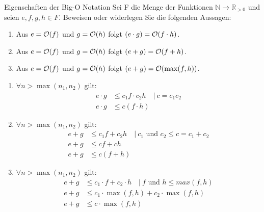 \documentclass{article}
\begin{document}
\begin{exercise}{Eigenschaften der Big-O Notation}
  Sei F die Menge der Funktionen $\mathbb{N} \rightarrow \mathbb{R}_{>0}$ und seien $e, f, g, h \in F$. Beweisen oder widerlegen Sie die folgenden Aussagen:
  \begin{enumerate}
    \item Aus $e = \mathcal{O}(f)$ und $g = \mathcal{O}(h)$ folgt $(e \cdot g) = \mathcal{O}(f \cdot h)$.
    \item Aus $e = \mathcal{O}(f)$ und $g = \mathcal{O}(h)$ folgt $(e + g) = \mathcal{O}(f + h)$.
    \item Aus $e = \mathcal{O}(f)$ und $g = \mathcal{O}(h)$ folgt $(e + g) = \mathcal{O}(\max(f,h))$.
  \end{enumerate}

  \begin{solution}
    \begin{enumerate}
      \item $\forall n>\max(n_1,n_2)$ gilt:
            \begin{align*}
              e \cdot g & \leq c_1 f \cdot c_2 h \quad|\ c=c_1c_2 \\
              e \cdot g & \leq c (f \cdot h)
            \end{align*}
      \item $\forall n>\max(n_1,n_2)$ gilt:
            \begin{align*}
              e + g & \leq c_1 f + c_2 h \quad|\ c_1 \text{ und } c_2 \leq c=c_1+c_2 \\
              e + g & \leq cf + ch                                                   \\
              e + g & \leq c(f + h)
            \end{align*}
      \item $\forall n>\max(n_1,n_2)$ gilt:
            \begin{align*}
              e + g & \leq c_1 \cdot f + c_2 \cdot h \quad|\ f\text{ und } h \leq max(f,h) \\
              e + g & \leq c_1 \cdot \max(f,h) + c_2 \cdot \max(f,h)                       \\
              e + g & \leq c \cdot \max(f,h)
            \end{align*}
    \end{enumerate}
  \end{solution}
\end{exercise}
\end{document}
